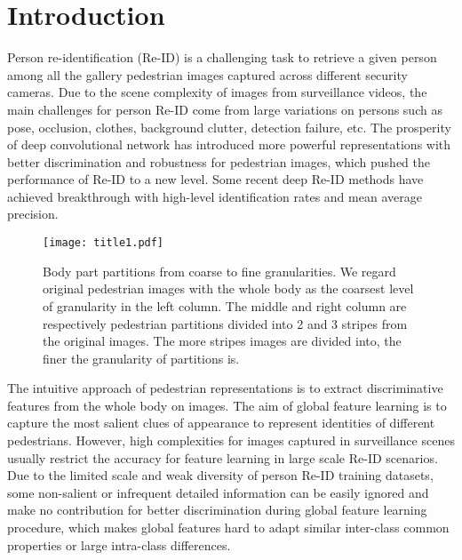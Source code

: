 \documentclass[sigconf]{acmart}
\begin{document}


\maketitle

\section{Introduction}
Person re-identification (Re-ID) is a challenging task to retrieve a given person among all the gallery pedestrian images captured across different security cameras. Due to the scene complexity of images from surveillance videos, the main challenges for person Re-ID come from large variations on persons such as pose, occlusion, clothes, background clutter, detection failure, etc. The prosperity of deep convolutional network has introduced more powerful representations with better discrimination and robustness for pedestrian images, which pushed the performance of Re-ID to a new level. Some recent deep Re-ID methods \cite{sarfraz2017pose,sun2017beyond,chang2018multilevel,shen2018deep,li2018harmoniou,shen2018end,chen2018group} have achieved breakthrough with high-level identification rates and mean average precision. 

\begin{figure}
	\texttt{[image: title1.pdf]}
	\caption{Body part partitions from coarse to fine granularities. We regard original pedestrian images with the whole body as the coarsest level of granularity in the left column. The middle and right column are respectively pedestrian partitions divided into 2 and 3 stripes from the original images. The more stripes images are divided into, the finer the granularity of partitions is.
	}
\end{figure}

The intuitive approach of pedestrian representations is to extract discriminative features from the whole body on images. The aim of global feature learning is to capture the most salient clues of appearance to represent identities of different pedestrians. However, high complexities for images captured in surveillance scenes usually restrict the accuracy for feature learning in large scale Re-ID scenarios. Due to the limited scale and weak diversity of person Re-ID training datasets, some non-salient or infrequent detailed information can be easily ignored and make no contribution for better discrimination during global feature learning procedure, which makes global features hard to adapt similar inter-class common properties or large intra-class differences. 
\end{document}
